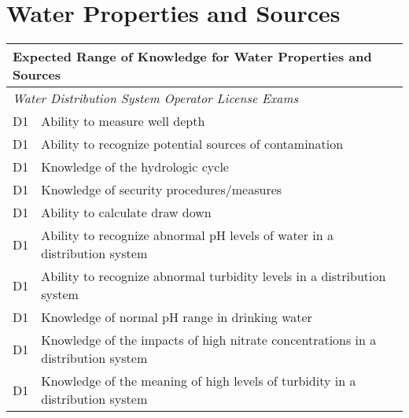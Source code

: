 \chapter{Water Properties and Sources}





\begin{table}[H]
\begin{tabular}{| m{1cm} | m{15cm} |}
\hline
\multicolumn{2}{|l|}{\textbf{Expected   Range of Knowledge for Water Properties and Sources}}                                                                          \\ \hline
\multicolumn{2}{|l|}{\textit{Water   Distribution System Operator License Exams}}                                                                                      \\ \hline
D1 & Ability to measure   well depth                                                                                                   \\ \hline
D1 & Ability to recognize   potential sources of contamination                                                                         \\ \hline
D1 & Knowledge of the   hydrologic cycle                                                                                               \\ \hline
D1 & Knowledge of security   procedures/measures                                                                                       \\ \hline
D1 & Ability to calculate   draw down                                                                                                  \\ \hline
D1 & Ability to recognize   abnormal pH levels of water in a distribution system                                                       \\ \hline
D1 & Ability to recognize   abnormal turbidity levels in a distribution system                                                         \\ \hline
D1 & Knowledge of normal   pH range in drinking water                                                                                  \\ \hline
D1 & Knowledge of the   impacts of high nitrate concentrations in a distribution system                                                \\ \hline
D1 & Knowledge of the   meaning of high levels of turbidity in a distribution system                                                   \\ \hline

\end{tabular}
\end{table}
